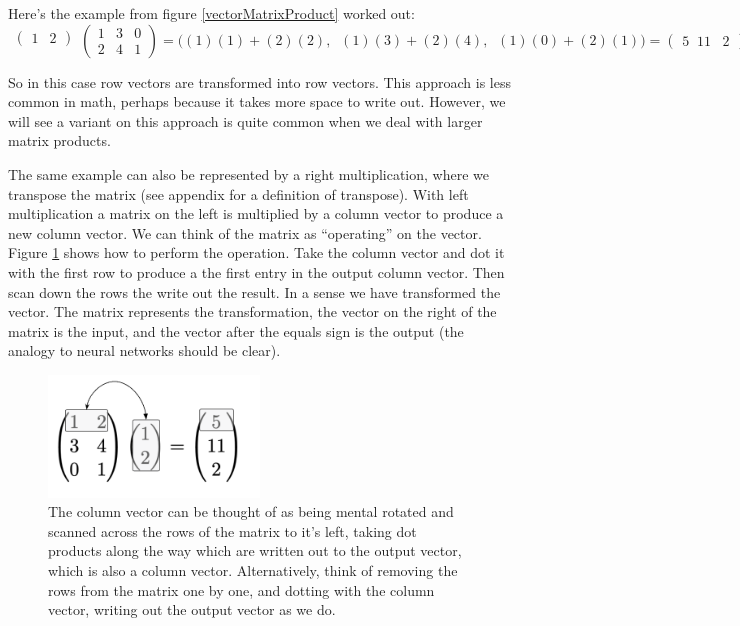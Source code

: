 Here's the example from figure \ref{vectorMatrixProduct} worked out:
\[
  \begin{matrix}\begin{pmatrix}1 & 2\end{pmatrix}\\\mbox{}\end{matrix}
  \begin{pmatrix} 1 & 3 & 0 \\ 2 & 4 & 1 \end{pmatrix} 
  =
  \bigg( (1)(1) + (2)(2) ,\;\; (1)(3) + (2)(4) ,\;\; (1)(0)+ (2)(1) \bigg)
  =
  \begin{pmatrix}  5 \;\; 11 \;\;\; 2  \end{pmatrix}
\]
\vspace*{.1cm} 

So in this case row vectors are transformed into row vectors. This approach is less common in math, perhaps because it takes more space to write out. However, we will see a variant on this approach is quite common when we deal with larger matrix products.

The same example can also be represented by a right multiplication, where we transpose the matrix (see appendix for a definition of transpose). With left multiplication  a matrix on the left is multiplied by a column vector to produce a new column vector. We can think of the matrix as ``operating'' on the vector. Figure \ref{matrixVectorProduct} shows how to perform the operation. Take the column vector and dot it with the first row to produce a the first entry in the output column vector. Then scan down the rows the write out the result.  In a sense we have transformed the vector. The matrix represents the transformation, the vector on the right of the matrix is the input, and the vector after the equals sign is the output (the analogy to neural networks should be clear).

\begin{figure}[h]
\centering
\includegraphics[width=0.5\textwidth]{images/matrixVectorProduct.png}
\caption[Jeff Yoshimi.]{The column vector can be thought of as being mental rotated and scanned across the rows of the matrix to it's left, taking dot products along the way which are written out to the output vector, which is also a column vector. Alternatively, think of removing the rows from the matrix one by one, and dotting with the column vector, writing out the output vector as we do.}
\label{matrixVectorProduct}
\end{figure}

